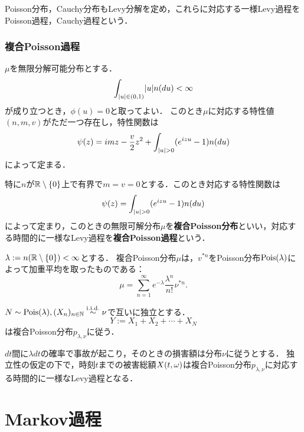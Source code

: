 \documentclass[uplatex,dvipdfmx]{jsreport}
\begin{document}
\begin{example}
    Poisson分布，Cauchy分布もLevy分解を定め，これらに対応する一様Levy過程をPoisson過程，Cauchy過程という．
\end{example}

\subsection{複合Poisson過程}

\begin{discussion}
    $\mu$を無限分解可能分布とする．
    \[\int_{\lvert u\rvert\in(0,1)}\lvert u\rvert n(du)<\infty\]
    が成り立つとき，$\phi(u)=0$と取ってよい．
    このとき$\mu$に対応する特性値$(n,m,v)$がただ一つ存在し，特性関数は
    \[\psi(z)=imz-\frac{v}{2}z^2+\int_{\lvert u\rvert>0}(e^{izu}-1)n(du)\]
    によって定まる．
\end{discussion}

\begin{definition}
    特に$n$が$\mathbb{R}\setminus\{0\}$上で有界で$m=v=0$とする．このとき対応する特性関数は
    \[\psi(z)=\int_{\lvert u\rvert>0}(e^{izu}-1)n(du)\]
    によって定まり，このときの無限可解分布$\mu$を\textbf{複合Poisson分布}といい，対応する時間的に一様なLevy過程を\textbf{複合Poisson過程}という．
\end{definition}

\begin{lemma}[複合Poisson分布の特徴付け]
    $\lambda:=n(\mathbb{R}\setminus\{0\})<\infty$とする．
    複合Poisson分布$\mu$は，$v^{*n}$をPoisson分布$\mathrm{Pois}(\lambda)$によって加重平均を取ったものである：
    \[\mu=\sum^\infty_{n=1}e^{-\lambda}\frac{\lambda^n}{n!}\nu^{*n}.\]
\end{lemma}

\begin{proposition}
    $N\sim\mathrm{Pois}(\lambda),(X_n)_{n\in\mathbb{N}}\overset{\mathrm{i.i.d.}}{\sim}\nu$で互いに独立とする．
    \[Y:=X_1+X_2+\cdots+X_N\]
    は複合Poisson分布$p_{\lambda,\nu}$に従う．
\end{proposition}
\begin{remarks}
    $dt$間に$\lambda dt$の確率で事故が起こり，そのときの損害額は分布$\nu$に従うとする．
    独立性の仮定の下で，時刻$t$までの被害総額$X(t,\omega)$は複合Poisson分布$p_{\lambda,\nu}$に対応する時間的に一様なLevy過程となる．
\end{remarks}

\chapter{Markov過程}
\end{document}
